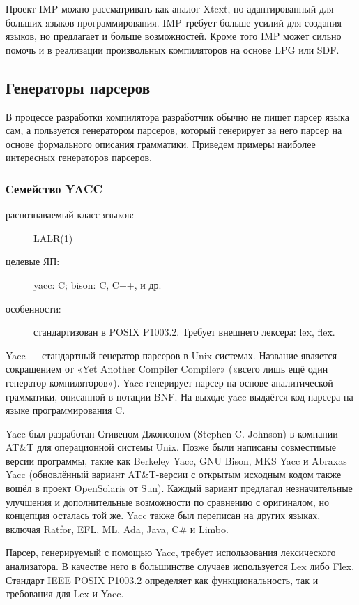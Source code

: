 \documentclass[a4paper,12pt,titlepage]{extarticle}
\begin{document}
Проект IMP можно рассматривать как аналог Xtext, но адаптированный для больших
языков программирования. IMP требует больше усилий для создания языков, но
предлагает и больше возможностей. Кроме того IMP может сильно помочь и в
реализации произвольных компиляторов на основе LPG или SDF.

\subsection{Генераторы парсеров}
В процессе разработки компилятора разработчик обычно не пишет парсер языка сам,
а пользуется генератором парсеров, который генерирует за него парсер на основе
формального описания грамматики. Приведем примеры наиболее интересных
генераторов парсеров.

\subsubsection*{Семейство YACC}
\begin{description}
  \item[распознаваемый класс языков:] LALR(1)
  \item[целевые ЯП:] yacc: C; bison: C, C++, и др.
  \item[особенности:] стандартизован в POSIX P1003.2. Требует внешнего лексера: lex, flex.
\end{description}
Yacc — стандартный генератор парсеров в Unix-системах. Название является
сокращением от «Yet Another Compiler Compiler» («всего лишь ещё один генератор
компиляторов»). Yacc генерирует парсер на основе аналитической грамматики,
описанной в нотации BNF. На выходе yacc выдаётся код парсера на языке
программирования C.

Yacc был разработан Стивеном Джонсоном (Stephen C. Johnson) в компании AT\&T
для операционной системы Unix. Позже были написаны совместимые версии
программы, такие как Berkeley Yacc, GNU Bison, MKS Yacc и Abraxas Yacc
(обновлённый вариант AT\&T-версии с открытым исходным кодом также вошёл в
проект OpenSolaris от Sun). Каждый вариант предлагал незначительные улучшения и
дополнительные возможности по сравнению с оригиналом, но концепция осталась той
же. Yacc также был переписан на других языках, включая Ratfor, EFL, ML, Ada,
Java, C\# и Limbo.

Парсер, генерируемый с помощью Yacc, требует использования лексического
анализатора. В качестве него в большинстве случаев используется Lex либо
Flex. Стандарт IEEE POSIX P1003.2 определяет как функциональность, так и
требования для Lex и Yacc.
\end{document}
